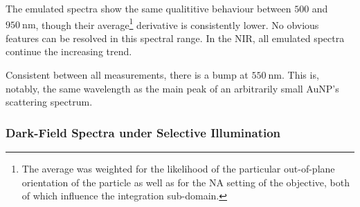 \documentclass[10pt]{article}
\begin{document}
The emulated spectra show the same qualititive behaviour between $500$ and $\SI{950}{\nano\meter}$, though their average\footnote{The average was weighted for the likelihood of the particular out-of-plane orientation of the particle as well as for the NA setting of the objective, both of which influence the integration sub-domain.} derivative is consistently  lower. 
No obvious features can be resolved in this spectral range. 
In the NIR, all emulated spectra continue the increasing trend. 


Consistent between all measurements, there is a bump at $\SI{550}{\nano\meter}$. 
This is, notably, the same wavelength as the main peak of an arbitrarily small AuNP's scattering spectrum. 




\subsubsection*{Dark-Field Spectra under Selective Illumination}
\end{document}
